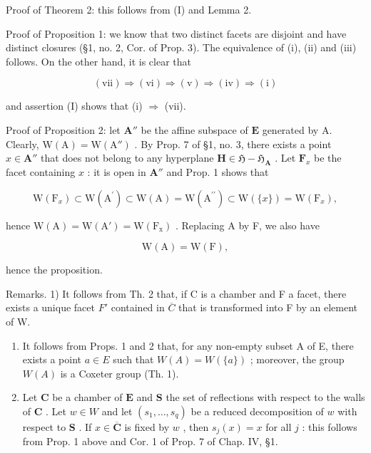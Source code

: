 Proof of Theorem 2: this follows from (I) and Lemma 2.

Proof of Proposition 1: we know that two distinct facets are disjoint and have distinct closures (§1, no. 2, Cor. of Prop. 3). The equivalence of (i), (ii) and (iii) follows. On the other hand, it is clear that

\[
(\mathrm{vii}) \Longrightarrow (\mathrm{vi}) \Longrightarrow (\mathrm{v}) \Longrightarrow (\mathrm{iv}) \Longrightarrow (\mathrm{i})
\]

and assertion (I) shows that (i) \(\Longrightarrow\) (vii).

Proof of Proposition 2: let \(\mathbf{A}''\) be the affine subspace of \(\mathbf{E}\) generated by A. Clearly, \(\mathrm{W(A)} = \mathrm{W(A'')}\) . By Prop. 7 of §1, no. 3, there exists a point \(x \in \mathbf{A}''\) that does not belong to any hyperplane \(\mathbf{H} \in \mathfrak{H} - \mathfrak{H}_{\mathbf{A}}\) . Let \(\mathbf{F}_x\) be the facet containing \(x\) : it is open in \(\mathbf{A}''\) and Prop. 1 shows that

\[
\mathrm{W} \left(\mathrm{F} _ {x}\right) \subset \mathrm{W} \left(\mathrm{A} ^ {\prime}\right) \subset \mathrm{W} (\mathrm{A}) = \mathrm{W} \left(\mathrm{A} ^ {\prime \prime}\right) \subset \mathrm{W} (\{x \}) = \mathrm{W} \left(\mathrm{F} _ {x}\right),
\]

hence \(\mathrm{W(A) = W(A') = W(F_x)}\) . Replacing A by F, we also have

\[
\mathrm{W} (\mathrm{A}) = \mathrm{W} (\mathrm{F}),
\]

hence the proposition.

Remarks. 1) It follows from Th. 2 that, if C is a chamber and F a facet, there exists a unique facet \(F'\) contained in \(\overline{C}\) that is transformed into F by an element of W.

\begin{enumerate}
\def\labelenumi{\arabic{enumi})}
\setcounter{enumi}{1}
\item
  It follows from Props. 1 and 2 that, for any non-empty subset A of E, there exists a point \(a \in E\) such that \(W(A) = W(\{a\})\) ; moreover, the group \(W(A)\) is a Coxeter group (Th. 1).
\item
  Let \(\mathbf{C}\) be a chamber of \(\mathbf{E}\) and \(\mathbf{S}\) the set of reflections with respect to the walls of \(\mathbf{C}\) . Let \(w \in W\) and let \((s_1, \ldots, s_q)\) be a reduced decomposition of \(w\) with respect to \(\mathbf{S}\) . If \(x \in \overline{\mathbf{C}}\) is fixed by \(w\) , then \(s_j(x) = x\) for all \(j\) : this follows from Prop. 1 above and Cor. 1 of Prop. 7 of Chap. IV, §1.
\end{enumerate}

